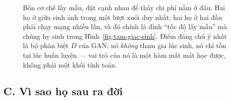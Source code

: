 \documentclass[../../../deep_learning.tex]{subfiles}
\begin{document}
\begin{figure}[H]
{}
\caption{Bốn cơ chế lấy mẫu, đặt cạnh nhau để thấy chi phí nằm ở đâu. Hai họ ở giữa sinh ảnh trong một lượt xuôi duy nhất; hai họ ở hai đầu phải chạy mạng nhiều lần, và đó chính là đỉnh ``tốc độ lấy mẫu'' mà chúng hy sinh trong Hình~\ref{fig:tam-giac-sinh}. Điểm đáng chú ý nhất là bộ phân biệt \(D\) của GAN: nó \emph{không} tham gia lúc sinh, nó chỉ tồn tại lúc huấn luyện --- vai trò của nó là một hàm mất mát học được, không phải một khối tính toán.}
\label{fig:bon-co-che-lay-mau}
\end{figure}

\subsection{C. Vì sao họ sau ra đời}
\end{document}
